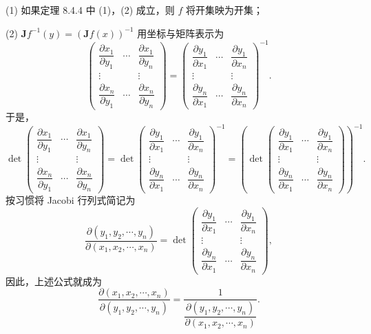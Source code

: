\begin{remark}\label{rem:8.4.2}
(1) 如果定理 8.4.4 中 (1)，(2) 成立，则 $f$ 将开集映为开集；

(2) $\boldsymbol{J}f^{-1}(y) = \left(\boldsymbol{J}f(x)\right)^{-1}$ 用坐标与矩阵表示为
\[
  \begin{pmatrix}
    \dfrac{\partial x_{1}}{\partial y_{1}} & \cdots & \dfrac{\partial x_{1}}{\partial y_{n}} \\
    \vdots & & \vdots \\
    \dfrac{\partial x_{n}}{\partial y_{1}} & \cdots & \dfrac{\partial x_{n}}{\partial y_{n}}
  \end{pmatrix} = \begin{pmatrix}
    \dfrac{\partial y_{1}}{\partial x_{1}} & \cdots & \dfrac{\partial y_{1}}{\partial x_{n}} \\
    \vdots & & \vdots \\
    \dfrac{\partial y_{n}}{\partial x_{1}} & \cdots & \dfrac{\partial y_{n}}{\partial x_{n}}
  \end{pmatrix}^{-1}.
\]
于是，
\[
  \det\begin{pmatrix}
    \dfrac{\partial x_{1}}{\partial y_{1}} & \cdots & \dfrac{\partial x_{1}}{\partial y_{n}} \\
    \vdots & & \vdots \\
    \dfrac{\partial x_{n}}{\partial y_{1}} & \cdots & \dfrac{\partial x_{n}}{\partial y_{n}}
  \end{pmatrix} = \det\begin{pmatrix}
    \dfrac{\partial y_{1}}{\partial x_{1}} & \cdots & \dfrac{\partial y_{1}}{\partial x_{n}} \\
    \vdots & & \vdots \\
    \dfrac{\partial y_{n}}{\partial x_{1}} & \cdots & \dfrac{\partial y_{n}}{\partial x_{n}}
  \end{pmatrix}^{-1} = \left(\det\begin{pmatrix}
    \dfrac{\partial y_{1}}{\partial x_{1}} & \cdots & \dfrac{\partial y_{1}}{\partial x_{n}} \\
    \vdots & & \vdots \\
    \dfrac{\partial y_{n}}{\partial x_{1}} & \cdots & \dfrac{\partial y_{n}}{\partial x_{n}}
  \end{pmatrix}\right)^{-1}.
\]
按习惯将 Jacobi 行列式简记为
\[
  \frac{\partial(y_{1},y_{2},\cdots,y_{n})}{\partial(x_{1},x_{2},\cdots,x_{n})} = \det\begin{pmatrix}
    \dfrac{\partial y_{1}}{\partial x_{1}} & \cdots & \dfrac{\partial y_{1}}{\partial x_{n}} \\
    \vdots & & \vdots \\
    \dfrac{\partial y_{n}}{\partial x_{1}} & \cdots & \dfrac{\partial y_{n}}{\partial x_{n}}
  \end{pmatrix},
\]
因此，上述公式就成为
\[
  \frac{\partial(x_{1},x_{2},\cdots,x_{n})}{\partial(y_{1},y_{2},\cdots,y_{n})} = \frac{1}{\dfrac{\partial(y_{1},y_{2},\cdots,y_{n})}{\partial(x_{1},x_{2},\cdots,x_{n})}}.
\]
\end{remark}

